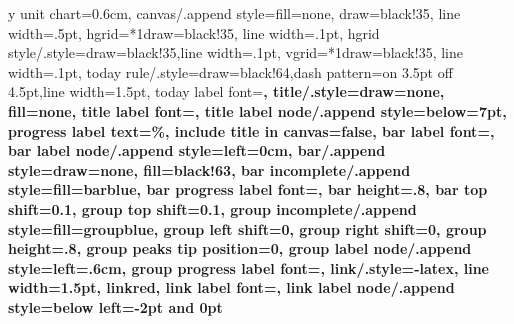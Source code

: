 \makeatletter
{}
\makeatother

\makeatletter
\AtBeginDocument{
\let\c@table\c@figure
\let\c@lstlisting\c@table
\let\c@algocf\c@lstlisting
}
\makeatother

\ifpdf
	\hypersetup{linktocpage=false} 	%
\else
	\hypersetup{linktocpage=true} 		%
	\usepackage[hyphenbreaks]{breakurl}
\fi


\renewcommand\sfdefault{phv}
\renewcommand\mddefault{mc}
\renewcommand\bfdefault{bc}
\sffamily
\ganttset
{%
	y unit chart=0.6cm,
	canvas/.append style={fill=none, draw=black!35, line width=.5pt},
	hgrid={*1{draw=black!35, line width=.1pt}},
	hgrid style/.style={draw=black!35,line width=.1pt},
	vgrid={*1{draw=black!35, line width=.1pt}},
	today rule/.style={draw=black!64,dash pattern=on 3.5pt off 4.5pt,line width=1.5pt},
	today label font=\small\bfseries,
	title/.style={draw=none, fill=none},
	title label font=\bfseries\footnotesize,
	title label node/.append style={below=7pt},
	progress label text={\%},
	include title in canvas=false,
	bar label font=\mdseries\small\color{black!70},
	bar label node/.append style={left=0cm},
	bar/.append style={draw=none, fill=black!63},
	bar incomplete/.append style={fill=barblue},
	bar progress label font=\mdseries\footnotesize\color{black!70},
	bar height=.8,
	bar top shift=0.1,
	group top shift=0.1,
	group incomplete/.append style={fill=groupblue},
	group left shift=0,
	group right shift=0,
	group height=.8,
	group peaks tip position=0,
	group label node/.append style={left=.6cm},
	group progress label font=\bfseries\small,
	link/.style={-latex, line width=1.5pt, linkred},
	link label font=\scriptsize\bfseries,
	link label node/.append style={below left=-2pt and 0pt}
}
